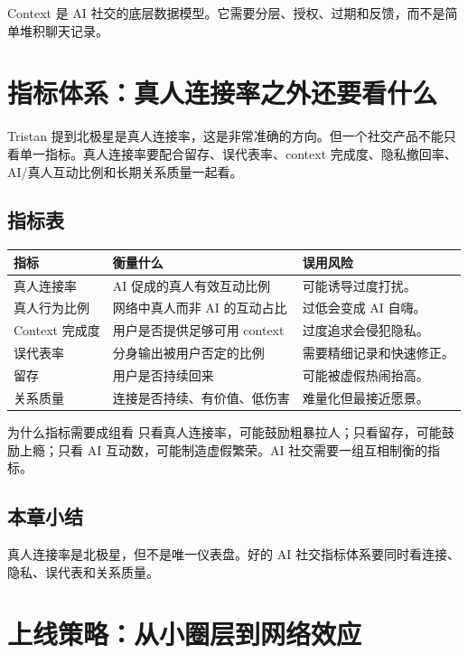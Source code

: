 \documentclass[a4paper]{article}
\begin{document}
Context 是 AI 社交的底层数据模型。它需要分层、授权、过期和反馈，而不是简单堆积聊天记录。

\section{指标体系：真人连接率之外还要看什么}

Tristan 提到北极星是真人连接率，这是非常准确的方向。但一个社交产品不能只看单一指标。真人连接率要配合留存、误代表率、context 完成度、隐私撤回率、AI/真人互动比例和长期关系质量一起看。

\subsection{指标表}

\noindent\begin{longtable}{p{}p{}p{}}
\toprule
指标 & 衡量什么 & 误用风险 \\
\midrule
真人连接率 & AI 促成的真人有效互动比例 & 可能诱导过度打扰。 \\
真人行为比例 & 网络中真人而非 AI 的互动占比 & 过低会变成 AI 自嗨。 \\
Context 完成度 & 用户是否提供足够可用 context & 过度追求会侵犯隐私。 \\
误代表率 & 分身输出被用户否定的比例 & 需要精细记录和快速修正。 \\
留存 & 用户是否持续回来 & 可能被虚假热闹抬高。 \\
关系质量 & 连接是否持续、有价值、低伤害 & 难量化但最接近愿景。 \\
\bottomrule
\end{longtable}

\begin{knowledgebox}{为什么指标需要成组看}
只看真人连接率，可能鼓励粗暴拉人；只看留存，可能鼓励上瘾；只看 AI 互动数，可能制造虚假繁荣。AI 社交需要一组互相制衡的指标。
\end{knowledgebox}

\subsection{本章小结}

真人连接率是北极星，但不是唯一仪表盘。好的 AI 社交指标体系要同时看连接、隐私、误代表和关系质量。

\section{上线策略：从小圈层到网络效应}
\end{document}
